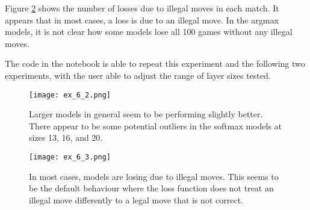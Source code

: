 \documentclass{somasmsc}
\begin{document}
\begin{exa}
 Figure \ref{ox:ex_6_3} shows the number of losses due to illegal moves in each match. It appears that in most cases, a loss is due to an illegal move. In the argmax models, it is not clear how some models lose all 100 games without any illegal moves.

The code in the notebook is able to repeat this experiment and the following two experiments, with the user able to adjust the range of layer sizes tested.

\begin{figure}[H]\label{ox:ex_6_2}
\begin{center}
\texttt{[image: ex\_6\_2.png]}
\end{center}
\caption{Larger models in general seem to be performing slightly better. There appear to be some potential outliers in the softmax models at sizes 13, 16, and 20.}
\end{figure}

\begin{figure}[H]\label{ox:ex_6_3}
\begin{center}
\texttt{[image: ex\_6\_3.png]}
\end{center}
\caption{In most cases, models are losing due to illegal moves. This seems to be the default behaviour where the loss function does not treat an illegal move differently to a legal move that is not correct.}
\end{figure}
\end{exa}
\end{document}

